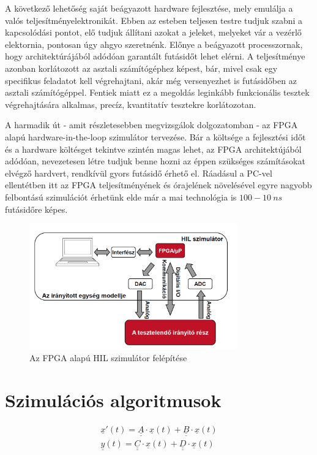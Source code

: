 A következő lehetőség saját beágyazott hardware fejlesztése, mely emulálja a valós teljesítményelektronikát. Ebben az esteben teljesen testre tudjuk szabni a kapcsolódási pontot, elő tudjuk állítani azokat a jeleket, melyeket vár a vezérlő elektornia, pontosan úgy ahgyo szeretnénk. Előnye a beágyazott processzornak, hogy architektúrájából adódóan garantált futásidőt lehet elérni. A teljesítménye azonban korlátozott az asztali számítógéphez képest, bár, mivel csak egy specifikus feladatot kell végrehajtani, akár még versenyezhet is futásidőben az asztali számítógéppel. Fentiek miatt ez a megoldás leginkább funkcionális tesztek végrehajtására alkalmas, precíz, kvantitatív tesztekre korlátozotan.

A harmadik út - amit részletesebben megvizsgálok dolgozatomban - az FPGA alapú hardware-in-the-loop szimulátor tervezése. Bár a költsége a fejlesztési időt és a hardware költésget tekintve szintén magas lehet, az FPGA architektújából adódóan, nevezetesen létre tudjuk benne hozni az éppen szükséges számításokat elvégző hardvert, rendkívül gyors futásidő érhető el. Ráadásul a PC-vel ellentétben itt az FPGA teljesítményének és órajelének növelésével egyre nagyobb felbontású szimulációt érhetünk elde már a mai technológia is $100 - 10 \ ns$ futásidőre képes.

\begin{figure}[h]
	\centering
	\includegraphics[width = 0.8\textwidth]{figures/hil_idea.png}
	\caption{Az FPGA alapú HIL szimulátor felépítése} 
	\label{fig:hil_idea}
\end{figure}


\section{Szimulációs algoritmusok}

\begin{equation}
\begin{align*}
\underline{x}'(t) = \underline{\underline{A}}\cdot \underline{x}(t) + \underline{\underline{B}}\cdot{}\underline{x}(t) \\[0.3em]

\underline{y}(t) = \underline{\underline{C}}\cdot \underline{x}(t) + \underline{\underline{D}}\cdot{}\underline{x}(t)
\end{align*} 
\end{equation}

